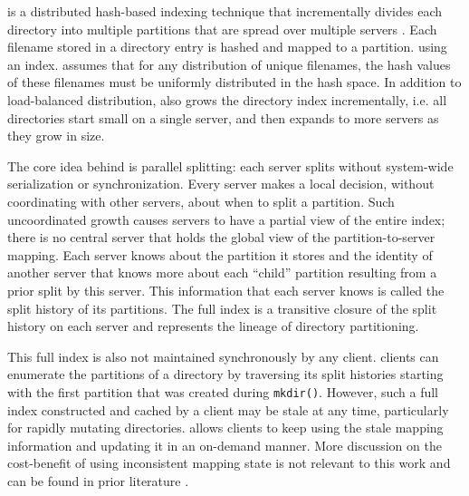 
\giga{} is a distributed hash-based indexing technique that incrementally
divides each directory into multiple partitions that are spread over multiple 
servers \citep{giga}.
Each filename stored in a directory entry is hashed and mapped to a partition. 
using an index. 
\giga{} assumes that for any distribution of unique filenames, the hash values of 
these filenames must be uniformly distributed in the hash space.
In addition to load-balanced distribution, \giga{} also grows the directory
index incrementally, i.e. all directories start small on a single server, and
then expands to more servers as they grow in size. 

The core idea behind \giga{} is parallel splitting: each server splits 
without system-wide serialization or synchronization.
Every server makes a local decision, without coordinating with other servers, 
about when to split a partition. 
Such uncoordinated growth causes \giga{} servers to have a partial view of the
entire index; there is no central server that holds the global view of the 
partition-to-server mapping.
Each server knows about the partition it stores and the 
identity of another server that knows more about each ``child'' partition resulting
from a prior split by this server. 
This information that each server knows is called the split history of its
partitions.
The full \giga{} index is a transitive closure of the split history on each
server and represents the lineage of directory partitioning.

This full index is also not maintained synchronously by any client.
\giga{} clients can enumerate the partitions of a directory by traversing 
its split histories starting with the first partition that was created during
\texttt{mkdir()}.
However, such a full index constructed and cached by a client may be stale at
any time, particularly for rapidly mutating directories.
\giga{} allows clients to keep using the stale mapping information and updating
it in an on-demand manner. More discussion on the cost-benefit of using
inconsistent mapping state is not relevant to this work and can be found in
prior \giga{} literature \citep{giga}. 



